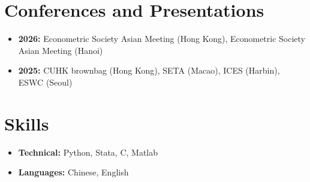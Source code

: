 \documentclass[11pt,a4paper]{article}
\begin{document}
\section{Conferences and Presentations}
\begin{itemize}[leftmargin=0em, itemsep=0.4em, label={}]
    \item \textbf{2026:} Econometric Society Asian Meeting (Hong Kong), Econometric Society Asian Meeting (Hanoi)
    \item \textbf{2025:} CUHK brownbag (Hong Kong), SETA (Macao), ICES (Harbin), ESWC (Seoul)
\end{itemize}

\section{Skills}
\begin{itemize}[leftmargin=0em, itemsep=0.2em, label={}]
    \item \textbf{Technical:} Python, Stata, C, Matlab
    \item \textbf{Languages:} Chinese, English
\end{itemize}
\end{document}
